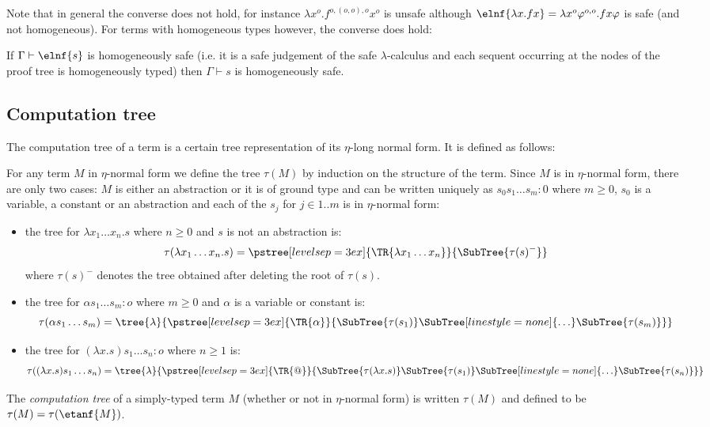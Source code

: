 Note that in general the converse does not hold, for instance $\lambda x^o . f^{o,(o,o),o} x^o$ is unsafe although $\elnf{\lambda x . f x} = \lambda x^o \varphi^{o,o} . f x \varphi$ is safe (and not homogeneous). For terms with homogeneous types however, the converse does hold:
\begin{lemma}
If $\Gamma \vdash \elnf{s}$ is homogeneously safe (i.e. it is a safe judgement of the safe $\lambda$-calculus and each sequent occurring at the nodes of the proof tree is homogeneously typed) then
$\Gamma \vdash s$ is homogeneously safe.
\end{lemma}


\subsection{Computation tree}
The computation tree of a term is a certain tree representation of its
$\eta$-long normal form. It is defined as follows:
\begin{definition}
\label{dfn:comptree}
For any term $M$ in $\eta$-normal form we define the tree $\tau(M)$ by induction
on the structure of the term.
Since $M$ is in $\eta$-normal form, there are only two cases:
$M$ is either an abstraction or it is of ground type and can be written uniquely as
$s_0 s_1 \ldots s_m : 0$ where $m\geq0$,  $s_0$ is a variable, a
constant or an abstraction and each of the $s_j$ for $j\in 1..m$ is in $\eta$-normal form:
\begin{itemize}
\item the tree for $\lambda x_1 \ldots x_n. s$ where $n\geq0$ and $s$ is not an abstraction is:
$$ \tau(\lambda x_1 \ldots x_n . s) =
      \pstree[levelsep=3ex]
        { \TR{\lambda x_1 \ldots x_n} }
        { \SubTree{\tau(s)^{-}} }
$$
where $\tau(s)^{-}$ denotes the tree obtained after deleting the root of $\tau(s)$.


\item the tree for $\alpha s_1 \ldots s_m : o$ where $m\geq0$ and $\alpha$ is a variable or constant is:
$$ \tau( \alpha s_1 \ldots s_m) =
    \tree{\lambda}
    {
        \pstree[levelsep=3ex]
            { \TR{\alpha} }
            { \SubTree{\tau(s_1)} \SubTree[linestyle=none]{\ldots} \SubTree{\tau(s_m)}
            }
    }
$$


\item the tree for $(\lambda x.s) s_1 \ldots s_n : o$ where $n \geq 1$ is:
$$ \tau((\lambda x.s) s_1 \ldots s_n) =
    \tree{\lambda}
    {
        \pstree[levelsep=3ex]
            { \TR{@} }
            {
            \SubTree{\tau(\lambda x.s)}    \SubTree{\tau(s_1)} \SubTree[linestyle=none]{\ldots} \SubTree{\tau(s_n)}
            }
    }
$$
\end{itemize}

The \emph{computation tree} of a simply-typed term $M$ (whether or not in $\eta$-normal form) is written $\tau(M)$
and defined to be $\tau(M) = \tau(\etanf{M})$.
\end{definition}

